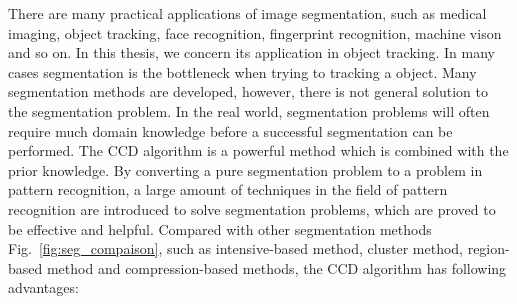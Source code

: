 There are many practical
applications of image segmentation, such as medical imaging, object
tracking, face recognition, fingerprint recognition, machine vison and
so on. In this thesis, we concern its application in object tracking.
In many cases segmentation is the bottleneck when trying to tracking a
object. Many segmentation methods are developed, however, there is not
general solution to the segmentation problem. In the real world,
segmentation problems will often require much domain knowledge before
a successful segmentation can be performed. The CCD algorithm is a
powerful method which is combined with the prior knowledge. By
converting a pure segmentation problem to a problem in pattern
recognition, a large amount of techniques in the field of pattern
recognition are introduced to solve segmentation problems, which are
proved to be effective and helpful. Compared with other segmentation
methods Fig.~\ref{fig:seg_compaison}, such as intensive-based method,  cluster method, region-based
method and compression-based methods, the CCD algorithm has following
advantages:
